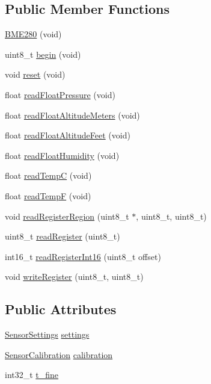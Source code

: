 \subsection*{Public Member Functions}
\begin{DoxyCompactItemize}
\item 
\hyperlink{class_b_m_e280_a9b9354e010528a0c3d452aa2459b808c}{B\+M\+E280} (void)
\item 
uint8\+\_\+t \hyperlink{class_b_m_e280_a994c102f010547f9c740a338ef9905c7}{begin} (void)
\item 
void \hyperlink{class_b_m_e280_aeec5deb6daace6ae390108b4210e9df7}{reset} (void)
\item 
float \hyperlink{class_b_m_e280_ada6e799917afb4f228e6253bc56ffe75}{read\+Float\+Pressure} (void)
\item 
float \hyperlink{class_b_m_e280_af67b56ba50760ee1d116acc6c5010221}{read\+Float\+Altitude\+Meters} (void)
\item 
float \hyperlink{class_b_m_e280_a6525c8a26f887b52596c86bed99343cb}{read\+Float\+Altitude\+Feet} (void)
\item 
float \hyperlink{class_b_m_e280_a42ea7232039eebf5aadb391ef6132c35}{read\+Float\+Humidity} (void)
\item 
float \hyperlink{class_b_m_e280_afffdd1d7ded9e1f92200e70669019d97}{read\+TempC} (void)
\item 
float \hyperlink{class_b_m_e280_a9648b496f6b4700550782a715a98b3c7}{read\+TempF} (void)
\item 
void \hyperlink{class_b_m_e280_aecca87c2c40a7f2bcabcea921bdc6124}{read\+Register\+Region} (uint8\+\_\+t $\ast$, uint8\+\_\+t, uint8\+\_\+t)
\item 
uint8\+\_\+t \hyperlink{class_b_m_e280_a1bbd14c8591966df531e40085342ff71}{read\+Register} (uint8\+\_\+t)
\item 
int16\+\_\+t \hyperlink{class_b_m_e280_ac43c30f9b321d301694094d6b4bebe7e}{read\+Register\+Int16} (uint8\+\_\+t offset)
\item 
void \hyperlink{class_b_m_e280_afcff21c342725246bf415d7f0e4d04f0}{write\+Register} (uint8\+\_\+t, uint8\+\_\+t)
\end{DoxyCompactItemize}
\subsection*{Public Attributes}
\begin{DoxyCompactItemize}
\item 
\hyperlink{_cool_spark_fun_b_m_e280_8h_d8/dd4/struct_sensor_settings}{Sensor\+Settings} \hyperlink{class_b_m_e280_af06253eb2f8ad4b5fabb858bc4a973bf}{settings}
\item 
\hyperlink{_cool_spark_fun_b_m_e280_8h_d0/d9c/struct_sensor_calibration}{Sensor\+Calibration} \hyperlink{class_b_m_e280_aa7a28484b6f5eb6f43261ea25016fbf8}{calibration}
\item 
int32\+\_\+t \hyperlink{class_b_m_e280_ad20f44914b78395f4d4bc64f4a68b369}{t\+\_\+fine}
\end{DoxyCompactItemize}


